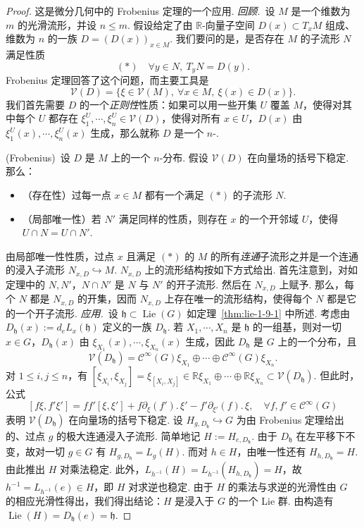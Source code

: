 \begin{proof}
这是微分几何中的 Frobenius 定理的一个应用.
\emph{回顾.}\ 设 $M$ 是一个维数为 $m$ 的光滑流形，并设 $n\leqslant m$. 假设给定了由 $\mathbb R$-向量子空间 $D(x)\subset T_{x}M$ 组成、维数为 $n$ 的一族 $D=(D(x))_{x\in M}$. 我们要问的是，是否存在 $M$ 的子流形 $N$ 满足性质
\[
(*)\quad \forall y\in N,\ T_{y}N=D(y).
\]
Frobenius 定理回答了这个问题，而主要工具是
\[
\mathcal V(D)=\{\xi\in\mathcal V(M),\ \forall x\in M,\ \xi(x)\in D(x)\}.
\]
我们首先需要 $D$ 的一个\emph{正则性}性质：如果可以用一些开集 $U$ 覆盖 $M$，使得对其中每个 $U$ 都存在 $\xi^{U}_{1},\cdots,\xi^{U}_{n}\in\mathcal V(D)$，使得对所有 $x\in U$，$D(x)$ 由 $\xi^{U}_{1}(x),\cdots,\xi^{U}_{n}(x)$ 生成，那么就称 $D$ 是一个 $n$-.
\begin{theorem*}
\textup{(Frobenius)}\ 设 $D$ 是 $M$ 上的一个 $n$-分布. 假设 $\mathcal V(D)$ 在向量场的括号下稳定. 那么：
\begin{itemize}[label=--]
\item （存在性）过每一点 $x\in M$ 都有一个满足 $(*)$ 的子流形 $N$.
\item （局部唯一性）若 $N'$ 满足同样的性质，则存在 $x$ 的一个开邻域 $U$，使得 $U\cap N=U\cap N'$.
\end{itemize}
\end{theorem*}
由局部唯一性性质，过点 $x$ 且满足 $(*)$ 的 $M$ 的所有\emph{连通}子流形之并是一个连通的浸入子流形 $N_{x,D}\hookrightarrow M$. $N_{x,D}$ 上的流形结构按如下方式给出. 首先注意到，对如定理中的 $N,N'$，$N\cap N'$ 是 $N$ 与 $N'$ 的开子流形. 然后在 $N_{x,D}$ 上赋予. 那么，每个 $N$ 都是 $N_{x,D}$ 的开集，因而 $N_{x,D}$ 上存在唯一的流形结构，使得每个 $N$ 都是它的一个开子流形.
\emph{应用.}\ 设 $\mathfrak h\subset\operatorname{Lie}(G)$ 如定理~\ref{thm:lie-1-9-1} 中所述. 考虑由 $D_{\mathfrak h}(x):=d_{e}L_{x}(\mathfrak h)$ 定义的一族 $D_{\mathfrak h}$. 若 $X_{1},\cdots,X_{n}$ 是 $\mathfrak h$ 的一组基，则对一切 $x\in G$，$D_{\mathfrak h}(x)$ 由 $\xi_{X_{1}}(x),\cdots,\xi_{X_{n}}(x)$ 生成，因此 $D_{\mathfrak h}$ 是 $G$ 上的一个分布，且
\[
\mathcal V(D_{\mathfrak h})=\mathcal C^{\infty}(G)\xi_{X_{1}}\oplus\cdots\oplus\mathcal C^{\infty}(G)\xi_{X_{n}}.
\]
对 $1\leqslant i,j\leqslant n$，有 $[\xi_{X_{i}},\xi_{X_{j}}]=\xi_{[X_{i},X_{j}]}\in\mathbb R\xi_{X_{1}}\oplus\cdots\oplus\mathbb R\xi_{X_{n}}\subset\mathcal V(D_{\mathfrak h})$. 但此时，公式
\[
[f\xi,f'\xi']=ff'[\xi,\xi']+f\partial_{\xi}(f').\,\xi'-f'\partial_{\xi'}(f).\,\xi,\quad\forall f,f'\in\mathcal C^{\infty}(G)
\]
表明 $\mathcal V(D_{\mathfrak h})$ 在向量场的括号下稳定.
设 $H_{g,D_{\mathfrak h}}\hookrightarrow G$ 为由 Frobenius 定理给出的、过点 $g$ 的极大连通浸入子流形. 简单地记 $H:=H_{e,D_{\mathfrak h}}$. 由于 $D_{\mathfrak h}$ 在左平移下不变，故对一切 $g\in G$ 有 $H_{g,D_{\mathfrak h}}=L_{g}(H)$. 而对 $h\in H$，由唯一性还有 $H_{h,D_{\mathfrak h}}=H$. 由此推出 $H$ 对乘法稳定. 此外，$L_{h^{-1}}(H)=L_{h^{-1}}(H_{h,D_{\mathfrak h}})=H$，故 $h^{-1}=L_{h^{-1}}(e)\in H$，即 $H$ 对求逆也稳定. 由于 $H$ 的乘法与求逆的光滑性由 $G$ 的相应光滑性得出，我们得出结论：$H$ 是浸入于 $G$ 的一个 Lie 群. 由构造有 $\operatorname{Lie}(H)=D_{\mathfrak h}(e)=\mathfrak h$.
\end{proof}

